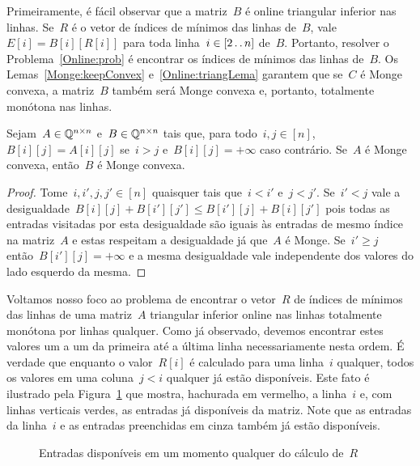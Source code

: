 Primeiramente, é fácil observar que a matriz~$B$ é online triangular inferior nas linhas. Se~$R$ é o vetor de índices de mínimos das linhas de~$B$, vale~$E[i] = B[i][R[i]]$ para toda linha~$i \in [2 \,.\,.\, n]$ de~$B$. Portanto, resolver o Problema~\ref{Online:prob} é encontrar os índices de mínimos das linhas de~$B$. Os Lemas~\ref{Monge:keepConvex} e~\ref{Online:triangLema} garantem que se~$C$ é Monge convexa, a matriz~$B$ também será Monge convexa e, portanto, totalmente monótona nas linhas. 

\begin{lema} \label{Online:triangLema}
Sejam~${ A \in \mathbb{Q}^{n \times n} }$ e~${ B \in \mathbb{Q}^{n \times n} }$ tais que, para todo~${ i,j \in [n] }$,~${ B[i][j] = A[i][j] }$ se~${ i > j }$ e~${ B[i][j] = +\infty }$ caso contrário. Se~$A$ é Monge convexa, então~$B$ é Monge convexa.
\end{lema}

\begin{proof}
Tome~${ i,i',j,j' \in [n] }$ quaisquer tais que~${ i < i' }$ e~${ j < j' }$. Se~${ i' < j }$ vale a desigualdade~${ B[i][j] + B[i'][j'] \leq B[i'][j] + B[i][j'] }$ pois todas as entradas visitadas por esta desigualdade são iguais às entradas de mesmo índice na matriz~$A$ e estas respeitam a desigualdade já que~$A$ é Monge. Se~${ i' \geq j }$ então~${ B[i'][j] = +\infty }$ e a mesma desigualdade vale independente dos valores do lado esquerdo da mesma.
\end{proof}

Voltamos nosso foco ao problema de encontrar o vetor~$R$ de índices de mínimos das linhas de uma matriz~$A$ triangular inferior online nas linhas totalmente monótona por linhas qualquer. Como já observado, devemos encontrar estes valores um a um da primeira até a última linha necessariamente nesta ordem. É verdade que enquanto o valor~$R[i]$ é calculado para uma linha~$i$ qualquer, todos os valores em uma coluna~${ j < i }$ qualquer já estão disponíveis. Este fato é ilustrado pela Figura~\ref{Online:dep:fig} que mostra, hachurada em vermelho, a linha~$i$ e, com linhas verticais verdes, as entradas já disponíveis da matriz. Note que as entradas da linha~$i$ e as entradas preenchidas em cinza também já estão disponíveis.

\begin{figure}[h]
    \centering
    
    \caption{Entradas disponíveis em um momento qualquer do cálculo de~$R$} \label{Online:dep:fig}
\end{figure}

